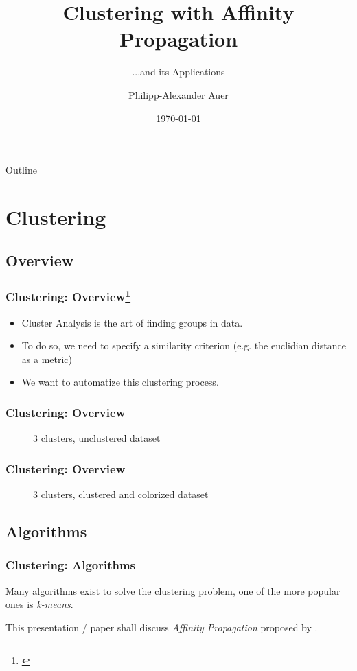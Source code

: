 \documentclass{beamer}
\title[Affinity Propagation]{%
  Clustering with Affinity Propagation
}
\subtitle{...and its Applications}
\author{Philipp-Alexander Auer}
\date{\today}
\begin{document}
\begin{frame}
  \titlepage
\end{frame}

\begin{frame}{Outline}
  \tableofcontents
\end{frame}

\section{Clustering}

\subsection[Overview]{Overview}
\begin{frame}[fragile]
  \frametitle{Clustering: Overview\footnote{\cite{kaufman2009finding}}}
  \begin{itemize}
  	\item Cluster Analysis is the art of finding groups in data. 
  	\item To do so, we need to specify a similarity criterion (e.g. the euclidian distance as a metric)
  	\item We want to automatize this clustering process.
  	
  \end{itemize}
\end{frame}
\begin{frame}[fragile]
\frametitle{Clustering: Overview}
\begin{figure}
	\centering
	\scalebox{0.65}{
		
	}
	\caption{3 clusters, unclustered dataset}
	\label{fig:unclust}
\end{figure}
\end{frame}

\begin{frame}[fragile]
\frametitle{Clustering: Overview}
\begin{figure}
	\centering
	\scalebox{0.65}{
		
	}
	\caption{3 clusters, clustered and colorized dataset}
	\label{fig:clust}
\end{figure}
\end{frame}

\subsection[classical]{Algorithms}
\begin{frame}
  \frametitle{Clustering: Algorithms}
  Many algorithms exist to solve the clustering problem, one of the more popular ones is \emph{k-means}. \cite{frey2007clustering}
  
  This presentation / paper shall discuss \emph{Affinity Propagation} proposed by \cite{frey2007clustering}. 
\end{frame}
\end{document}
